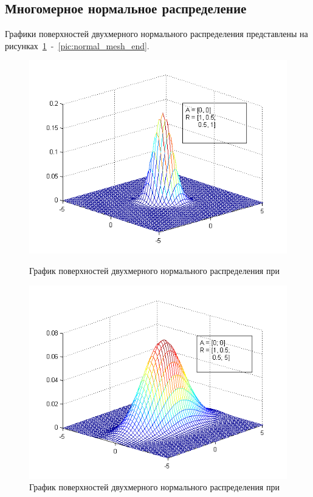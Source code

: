 \newpage
\subsection{Многомерное нормальное распределение}

Графики поверхностей двухмерного нормального распределения представлены
на рисунках~\ref{pic:normal_mesh_start}~-~\ref{pic:normal_mesh_end}.

\begin{figure}[h]
  \begin{minipage}[h]{0.49\linewidth}
    \includegraphics[width=1\linewidth]{../pic/new/normal_mesh_1}
    \caption{График поверхностей двухмерного нормального распределения при}
    \label{pic:normal_mesh_start}
  \end{minipage}
  \hfill
  \begin{minipage}[h]{0.49\linewidth}
    \vspace{4mm}
    \includegraphics[width=1\linewidth]{../pic/new/normal_mesh_2}
    \caption{График поверхностей двухмерного нормального распределения при}
  \end{minipage}
\end{figure}

